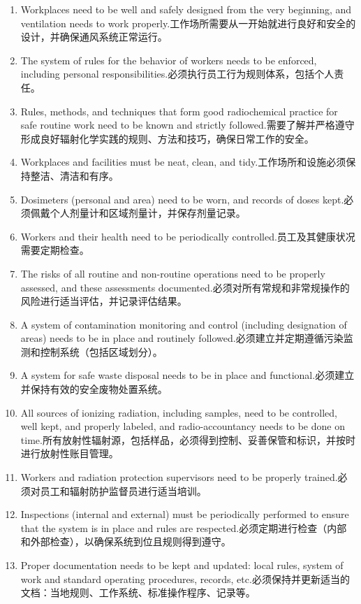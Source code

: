 \documentclass[dvipsnames, svgnames,a4paper,11pt]{article}
\begin{document}
\begin{enumerate}
  \item Workplaces need to be well and safely designed from the very beginning, and ventilation needs to work properly.工作场所需要从一开始就进行良好和安全的设计，并确保通风系统正常运行。
  \item The system of rules for the behavior of workers needs to be enforced, including personal responsibilities.必须执行员工行为规则体系，包括个人责任。
  \item Rules, methods, and techniques that form good radiochemical practice for safe routine work need to be known and strictly followed.需要了解并严格遵守形成良好辐射化学实践的规则、方法和技巧，确保日常工作的安全。
  \item Workplaces and facilities must be neat, clean, and tidy.工作场所和设施必须保持整洁、清洁和有序。
  \item Dosimeters (personal and area) need to be worn, and records of doses kept.必须佩戴个人剂量计和区域剂量计，并保存剂量记录。
  \item Workers and their health need to be periodically controlled.员工及其健康状况需要定期检查。
  \item The risks of all routine and non-routine operations need to be properly assessed, and these assessments documented.必须对所有常规和非常规操作的风险进行适当评估，并记录评估结果。
  \item A system of contamination monitoring and control (including designation of areas) needs to be in place and routinely followed.必须建立并定期遵循污染监测和控制系统（包括区域划分）。
  \item A system for safe waste disposal needs to be in place and functional.必须建立并保持有效的安全废物处置系统。
  \item All sources of ionizing radiation, including samples, need to be controlled, well kept, and properly labeled, and radio-accountancy needs to be done on time.所有放射性辐射源，包括样品，必须得到控制、妥善保管和标识，并按时进行放射性账目管理。
  \item Workers and radiation protection supervisors need to be properly trained.必须对员工和辐射防护监督员进行适当培训。
  \item Inspections (internal and external) must be periodically performed to ensure that the system is in place and rules are respected.必须定期进行检查（内部和外部检查），以确保系统到位且规则得到遵守。
  \item Proper documentation needs to be kept and updated: local rules, system of work and standard operating procedures, records, etc.必须保持并更新适当的文档：当地规则、工作系统、标准操作程序、记录等。
\end{enumerate}
\end{document}
